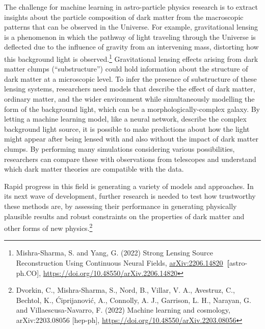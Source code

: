 The challenge for machine learning in astro-particle physics research is
to extract insights about the particle composition of dark matter from
the macroscopic patterns that can be observed in the Universe. For
example, gravitational lensing is a phenomenon in which the pathway of
light traveling through the Universe is deflected due to the influence
of gravity from an intervening mass, distorting how this background
light is observed.\footnote{Mishra-Sharma, S. and Yang, G. (2022) Strong
  Lensing Source Reconstruction Using Continuous Neural Fields,
  \href{https://arxiv.org/abs/2206.14820}{\uline{arXiv:2206.14820}}\textbf{~{[}}astro-ph.CO{]},
  \url{https://doi.org/10.48550/arXiv.2206.14820}} Gravitational lensing
effects arising from dark matter clumps (``substructure'') could hold
information about the structure of dark matter at a microscopic level.
To infer the presence of substructure of these lensing systems,
researchers need models that describe the effect of dark matter,
ordinary matter, and the wider environment while simultaneously
modelling the form of the background light, which can be a
morphologically-complex galaxy. By letting a machine learning model,
like a neural network, describe the complex background light source, it
is possible to make predictions about how the light might appear after
being lensed with and also without the impact of dark matter clumps. By
performing many simulations considering various possibilities,
researchers can compare these with observations from telescopes and
understand which dark matter theories are compatible with the data.

Rapid progress in this field is generating a variety of models and
approaches. In its next wave of development, further research is needed
to test how trustworthy these methods are, by assessing their
performance in generating physically plausible results and robust
constraints on the properties of dark matter and other forms of new
physics.\footnote{Dvorkin, C., Mishra-Sharma, S., Nord, B., Villar, V.
  A., Avestruz, C., Bechtol, K., Ćiprijanović, A., Connolly, A. J.,
  Garrison, L. H., Narayan, G. and Villaescusa-Navarro, F. (2022)
  Machine learning and cosmology, arXiv:2203.08056 {[}hep-ph{]},
  \url{https://doi.org/10.48550/arXiv.2203.08056}}

